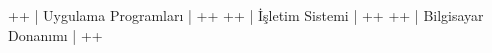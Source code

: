\documentclass[a4paper,10pt,turkish]{sphinxmanual}
\begin{document}
\begin{sphinxVerbatim}[commandchars=\\\{\}]
    +\PYGZhy{}\PYGZhy{}\PYGZhy{}\PYGZhy{}\PYGZhy{}\PYGZhy{}\PYGZhy{}\PYGZhy{}\PYGZhy{}\PYGZhy{}\PYGZhy{}\PYGZhy{}\PYGZhy{}\PYGZhy{}\PYGZhy{}\PYGZhy{}\PYGZhy{}\PYGZhy{}\PYGZhy{}\PYGZhy{}\PYGZhy{}\PYGZhy{}+
    | Uygulama Programları |
    +\PYGZhy{}\PYGZhy{}\PYGZhy{}\PYGZhy{}\PYGZhy{}\PYGZhy{}\PYGZhy{}\PYGZhy{}\PYGZhy{}\PYGZhy{}\PYGZhy{}\PYGZhy{}\PYGZhy{}\PYGZhy{}\PYGZhy{}\PYGZhy{}\PYGZhy{}\PYGZhy{}\PYGZhy{}\PYGZhy{}\PYGZhy{}\PYGZhy{}+
+\PYGZhy{}\PYGZhy{}\PYGZhy{}\PYGZhy{}\PYGZhy{}\PYGZhy{}\PYGZhy{}\PYGZhy{}\PYGZhy{}\PYGZhy{}\PYGZhy{}\PYGZhy{}\PYGZhy{}\PYGZhy{}\PYGZhy{}\PYGZhy{}\PYGZhy{}\PYGZhy{}\PYGZhy{}\PYGZhy{}\PYGZhy{}\PYGZhy{}\PYGZhy{}\PYGZhy{}\PYGZhy{}\PYGZhy{}\PYGZhy{}\PYGZhy{}\PYGZhy{}+
|       İşletim Sistemi       |
+\PYGZhy{}\PYGZhy{}\PYGZhy{}\PYGZhy{}\PYGZhy{}\PYGZhy{}\PYGZhy{}\PYGZhy{}\PYGZhy{}\PYGZhy{}\PYGZhy{}\PYGZhy{}\PYGZhy{}\PYGZhy{}\PYGZhy{}\PYGZhy{}\PYGZhy{}\PYGZhy{}\PYGZhy{}\PYGZhy{}\PYGZhy{}\PYGZhy{}\PYGZhy{}\PYGZhy{}\PYGZhy{}\PYGZhy{}\PYGZhy{}\PYGZhy{}\PYGZhy{}+
+\PYGZhy{}\PYGZhy{}\PYGZhy{}\PYGZhy{}\PYGZhy{}\PYGZhy{}\PYGZhy{}\PYGZhy{}\PYGZhy{}\PYGZhy{}\PYGZhy{}\PYGZhy{}\PYGZhy{}\PYGZhy{}\PYGZhy{}\PYGZhy{}\PYGZhy{}\PYGZhy{}\PYGZhy{}\PYGZhy{}\PYGZhy{}\PYGZhy{}\PYGZhy{}\PYGZhy{}\PYGZhy{}\PYGZhy{}\PYGZhy{}\PYGZhy{}\PYGZhy{}\PYGZhy{}\PYGZhy{}\PYGZhy{}\PYGZhy{}\PYGZhy{}\PYGZhy{}+
|        Bilgisayar Donanımı        |
+\PYGZhy{}\PYGZhy{}\PYGZhy{}\PYGZhy{}\PYGZhy{}\PYGZhy{}\PYGZhy{}\PYGZhy{}\PYGZhy{}\PYGZhy{}\PYGZhy{}\PYGZhy{}\PYGZhy{}\PYGZhy{}\PYGZhy{}\PYGZhy{}\PYGZhy{}\PYGZhy{}\PYGZhy{}\PYGZhy{}\PYGZhy{}\PYGZhy{}\PYGZhy{}\PYGZhy{}\PYGZhy{}\PYGZhy{}\PYGZhy{}\PYGZhy{}\PYGZhy{}\PYGZhy{}\PYGZhy{}\PYGZhy{}\PYGZhy{}\PYGZhy{}\PYGZhy{}+
\end{sphinxVerbatim}
\end{document}
